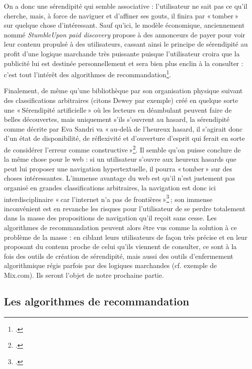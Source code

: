 On a donc une sérendipité qui semble associative : l’utilisateur ne sait pas ce qu’il cherche, mais, à force de naviguer et d’affiner ses gouts, il finira par « tomber » sur quelque chose d’intéressant. Sauf qu’ici, le modèle économique, anciennement nommé \textit{StumbleUpon paid discovery} propose à des annonceurs de payer pour voir leur contenu propulsé à des utilisateurs, cassant ainsi le principe de sérendipité au profit d’une logique marchande très puissante puisque l’utilisateur croira que la publicité lui est destinée personnellement et sera bien plus enclin à la consulter : c’est tout l’intérêt des algorithmes de recommandation\footcite{author2012}.

Finalement, de même qu’une bibliothèque par son organisation physique suivant des classifications arbitraires (citons Dewey par exemple) créé en quelque sorte une « Sérendipité artificielle » où les lecteurs en déambulant peuvent faire de belles découvertes, mais uniquement s’ils s’ouvrent au hasard, la sérendipité comme décrite par Eva Sandri va « au-delà de l’heureux hasard, il s’agirait donc d’un état de disponibilité, de réflexivité et d’ouverture d’esprit qui ferait en sorte de considérer l’erreur comme constructive »\footcite[p. 14]{zotero-221}. Il semble qu’on puisse conclure de la même chose pour le web : si un utilisateur s’ouvre aux heureux hasards que peut lui proposer une navigation hypertextuelle, il pourra « tomber » sur des choses intéressantes. L’immense avantage du web est qu’il n’est justement pas organisé en grandes classifications arbitraires, la navigation est donc ici interdisciplinaire « car l’internet n’a pas de frontières »\footcite[8 minutes 34 secondes]{2015} ; son immense inconvénient est en revanche les risques pour l’utilisateur de se perdre totalement dans la masse des propositions de navigation qu’il reçoit sans cesse. Les algorithmes de recommandation peuvent alors être vus comme la solution à ce problème de la masse : en ciblant leurs utilisateurs de façon très précise et en leur proposant du contenu proche de celui qu’ils viennent de consulter, ce sont à la fois des outils de création de sérendipité, mais aussi des outils d’enfermement algorithmique régis parfois par des logiques marchandes (cf. exemple de Mix.com). Ils seront l’objet de notre prochaine partie.


\subsection{Les algorithmes de recommandation}



